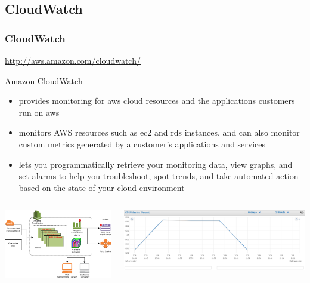 \documentclass{beamer}
\begin{document}
\subsection{CloudWatch}
\begin{frame}
\frametitle[CloudWatch]{CloudWatch}
\url{http://aws.amazon.com/cloudwatch/}

Amazon CloudWatch 
\begin{itemize}
\item provides monitoring for \gls{aws} cloud resources and the applications customers run on \gls{aws}
\item monitors AWS resources such as \gls{ec2} and \gls{rds} instances, and can also monitor custom metrics generated by a customer’s applications and services
\item lets you programmatically retrieve your monitoring data, view graphs, and set alarms to help you troubleshoot, spot trends, and take automated action based on the state of your cloud environment
\end{itemize}
\begin{columns}
\begin{center}
\includegraphics[width=1.0 \textwidth]{CW-Overview.png}
\end{center}
\begin{center}
\includegraphics[width=1.0 \textwidth]{cpuutilization.png}
\end{center}
\end{columns}
\end{frame}
\end{document}
